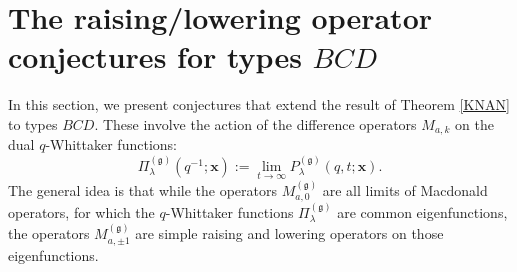 \documentclass[12pt]{amsart}
\newcommand{\g}{{\mathfrak{g}}}
\newcommand{\bx}{{\mathbf x}}
\numberwithin{equation}{section}
\numberwithin{table}{section}
\begin{document}
\section{The raising/lowering operator conjectures for types $BCD$}

In this section, we present conjectures that extend the result of Theorem \ref{KNAN} to types $BCD$.
These involve the action of the difference operators $M_{a,k}$ on the dual $q$-Whittaker functions:
$$\Pi_\lambda^{(\g)}(q^{-1};\bx):=\lim_{t\to\infty} P_\lambda^{(\g)}(q,t;\bx).$$
The general idea is that while the operators $M_{a,0}^{(\g)}$ are all limits of Macdonald operators, for which the
$q$-Whittaker functions $\Pi_\lambda^{(\g)}$ are common eigenfunctions, the operators $M_{a,\pm 1}^{(\g)}$ are simple raising and lowering operators on those eigenfunctions.
\end{document}

